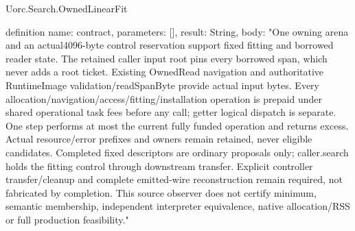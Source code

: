 \begin{lexlean}{Uorc.Search.OwnedLinearFit}
\begin{semanticmodule}
definition{
  name: contract,
  parameters: [],
  result: String,
  body: "One owning arena and an actual4096-byte control reservation support fixed fitting and borrowed reader state. The retained caller input root pins every borrowed span, which never adds a root ticket. Existing OwnedRead navigation and authoritative RuntimeImage validation/readSpanByte provide actual input bytes. Every allocation/navigation/access/fitting/installation operation is prepaid under shared operational task fees before any call; getter logical dispatch is separate. One step performs at most the current fully funded operation and returns excess. Actual resource/error prefixes and owners remain retained, never eligible candidates. Completed fixed descriptors are ordinary proposals only; caller.search holds the fitting control through downstream transfer. Explicit controller transfer/cleanup and complete emitted-wire reconstruction remain required, not fabricated by completion. This source observer does not certify minimum, semantic membership, independent interpreter equivalence, native allocation/RSS or full production feasibility."
}
\end{semanticmodule}
\end{lexlean}
